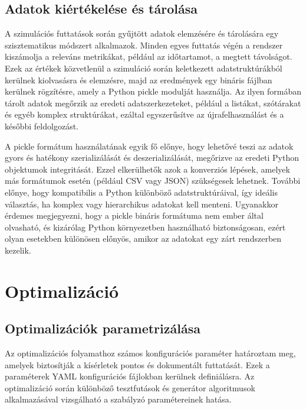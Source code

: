 \subsection{Adatok kiértékelése és tárolása}
A szimulációs futtatások során gyűjtött adatok elemzésére és tárolására egy szisztematikus módszert alkalmazok. Minden egyes futtatás végén a rendszer kiszámolja a releváns metrikákat, például az időtartamot, a megtett távolságot. Ezek az értékek közvetlenül a szimuláció során keletkezett adatstruktúrákból kerülnek kiolvasásra és elemzésre, majd az eredmények egy bináris fájlban kerülnek rögzítésre, amely a Python pickle modulját használja. Az ilyen formában tárolt adatok megőrzik az eredeti adatszerkezeteket, például a listákat, szótárakat és egyéb komplex struktúrákat, ezáltal egyszerűsítve az újrafelhasználást és a későbbi feldolgozást.

A pickle formátum használatának egyik fő előnye, hogy lehetővé teszi az adatok gyors és hatékony szerializálását és deszerializálását, megőrizve az eredeti Python objektumok integritását. Ezzel elkerülhetők azok a konverziós lépések, amelyek más formátumok esetén (például CSV vagy JSON) szükségesek lehetnek. További előnye, hogy kompatibilis a Python különböző adatstruktúráival, így ideális választás, ha komplex vagy hierarchikus adatokat kell menteni. Ugyanakkor érdemes megjegyezni, hogy a pickle bináris formátuma nem ember által olvasható, és kizárólag Python környezetben használható biztonságosan, ezért olyan esetekben különösen előnyös, amikor az adatokat egy zárt rendszerben kezelik.

\section{Optimalizáció}
\subsection{Optimalizációk parametrizálása}
Az optimalizációs folyamathoz számos konfigurációs paraméter határoztam meg, amelyek biztosítják a kísérletek pontos és dokumentált futtatását. Ezek a paraméterek YAML konfigurációs fájlokban kerülnek definiálásra. Az optimalizáció során különböző tesztfutások és generátor algoritmusok alkalmazásával vizsgálható a szabályzó paramétereinek hatása.

